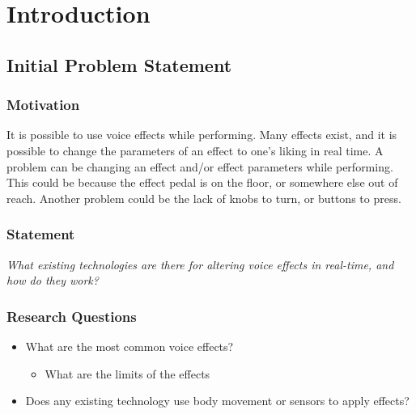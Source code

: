 \chapter{Introduction}

\section{Initial Problem Statement}

\subsection{Motivation}

It is possible to use voice effects while performing. Many effects exist, and it is possible to change the parameters of an effect to one's liking in real time. 
A problem can be changing an effect and/or effect parameters while performing. This could be because the effect pedal is on the floor, or somewhere else out of reach. Another problem could be the lack of knobs to turn, or buttons to press.

\subsection{Statement}

\textit{What existing technologies are there for altering voice effects in real-time, and how do they work?}


\subsection{Research Questions}

\begin{itemize}
	\item What are the most common voice effects?
	\begin{itemize}
		\item What are the limits of the effects
	\end{itemize}
	\item Does any existing technology use body movement or sensors to apply effects?
\end{itemize}